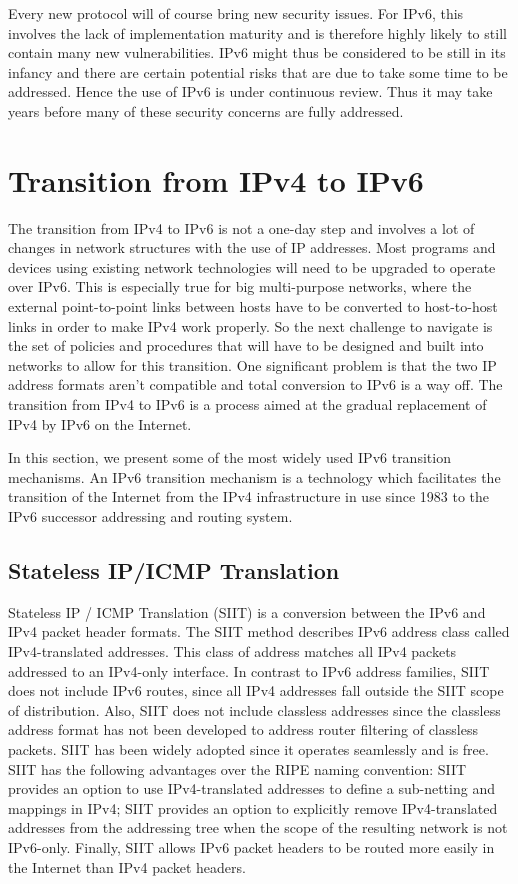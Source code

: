 \documentclass[conference,12pt]{IEEEtran}
\begin{document}
Every new protocol will of course bring new security issues. For IPv6, this involves the lack of implementation maturity and is therefore highly likely to still contain many new vulnerabilities. IPv6 might thus be considered to be still in its infancy and there are certain potential risks that are due to take some time to be addressed. Hence the use of IPv6 is under continuous review. Thus it may take years before many of these security concerns are fully addressed.

\section{Transition from IPv4 to IPv6}
The transition from IPv4 to IPv6 is not a one-day step and involves a lot of changes in network structures with the use of IP addresses.  Most programs and devices using existing network technologies will need to be upgraded to operate over IPv6. This is especially true for big multi-purpose networks, where the external point-to-point links between hosts have to be converted to host-to-host links in order to make IPv4 work properly. So the next challenge to navigate is the set of policies and procedures that will have to be designed and built into networks to allow for this transition. One significant problem is that the two IP address formats aren't compatible and total conversion to IPv6 is a way off. The transition from IPv4 to IPv6 is a process aimed at the gradual replacement of IPv4 by IPv6 on the Internet.

In this section, we present some of the most widely used IPv6 transition mechanisms. An IPv6 transition mechanism is a technology which facilitates the transition of the Internet from the IPv4 infrastructure in use since 1983 to the IPv6 successor addressing and routing system.

\subsection{Stateless IP/ICMP Translation}
Stateless IP / ICMP Translation (SIIT) is a conversion between the IPv6 and IPv4 packet header formats. The SIIT method describes IPv6 address class called IPv4-translated addresses. This class of address matches all IPv4 packets addressed to an IPv4-only interface. In contrast to IPv6 address families, SIIT does not include IPv6 routes, since all IPv4 addresses fall outside the SIIT scope of distribution. Also, SIIT does not include classless addresses since the classless address format has not been developed to address router filtering of classless packets. SIIT has been widely adopted since it operates seamlessly and is free. SIIT has the following advantages over the RIPE naming convention: SIIT provides an option to use IPv4-translated addresses to define a sub-netting and mappings in IPv4; SIIT provides an option to explicitly remove IPv4-translated addresses from the addressing tree when the scope of the resulting network is not IPv6-only. Finally, SIIT allows IPv6 packet headers to be routed more easily in the Internet than IPv4 packet headers.
\end{document}
